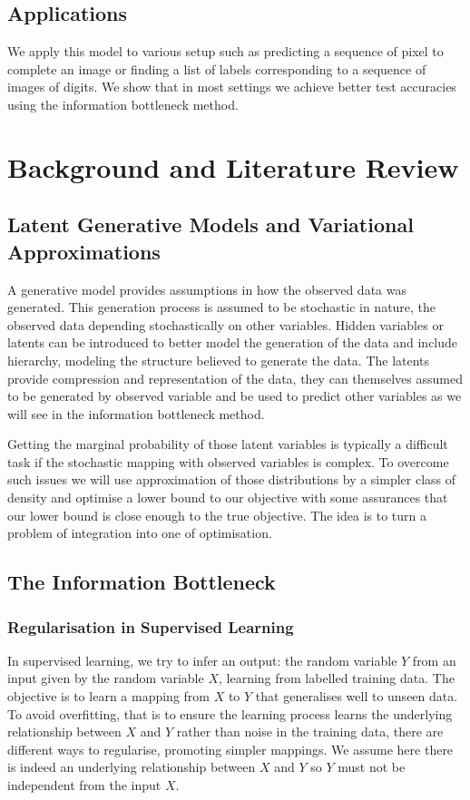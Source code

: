 \documentclass[10pt,oneside,openright]{report}
\begin{document}
\section{Applications}
We apply this model to various setup such as predicting a sequence of pixel to complete an image or finding a list of labels corresponding to a sequence of images of digits. We show that in most settings we achieve better test accuracies using the information bottleneck method.

\chapter{Background and Literature Review}
\section{Latent Generative Models and Variational Approximations}

A generative model provides assumptions in how the observed data was generated. This generation process is assumed to be stochastic in nature, the observed data depending stochastically on other variables. Hidden variables or latents can be introduced to better model the generation of the data and include hierarchy, modeling the structure believed to generate the data. The latents provide compression and representation of the data, they can themselves assumed to be generated by observed variable and be used to predict other variables as we will see in the information bottleneck method. 

Getting the marginal probability of those latent variables is typically a difficult task if the stochastic mapping with observed variables is complex. To overcome such issues we will use approximation of those distributions by a simpler class of density and optimise a lower bound to our objective with some assurances that our lower bound is close enough to the true objective. The idea is to turn a problem of integration into one of optimisation.

\section{The Information Bottleneck}
\subsection{Regularisation in Supervised Learning}
In supervised learning, we try to infer an output: the random variable $Y$ from an input given by the random variable $X$, learning from labelled training data. The objective is to learn a mapping from $X$ to $Y$ that generalises well to unseen data. To avoid overfitting, that is to ensure the learning process learns the underlying relationship between $X$ and $Y$ rather than noise in the training data, there are different ways to regularise, promoting simpler mappings. We assume here there is indeed an underlying relationship between $X$ and $Y$ so $Y$ must not be independent from the input $X$.
\end{document}
